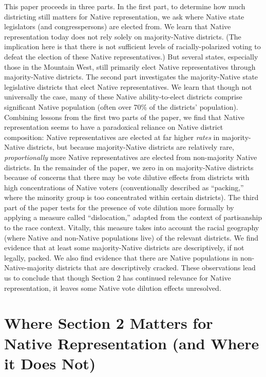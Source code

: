 \documentclass[12pt]{article}
\begin{document}
This paper proceeds in three parts. In the first part, to determine how much districting still matters for Native representation, we ask where Native state legislators (and congresspersons) are elected from. We learn that Native representation today does not rely solely on majority-Native districts. (The implication here is that there is not sufficient levels of racially-polarized voting to defeat the election of these Native representatives.) But several states, especially those in the Mountain West, still primarily elect Native representatives through majority-Native districts. The second part investigates the majority-Native state legislative districts that elect Native representatives. We learn that though not universally the case, many of these Native ability-to-elect districts comprise significant Native population (often over 70\% of the districts' population). Combining lessons from the first two parts of the paper, we find that Native representation seems to have a paradoxical reliance on Native district composition: Native representatives are elected at far higher \emph{rates} in majority-Native districts, but because majority-Native districts are relatively rare, \emph{proportionally} more Native representatives are elected from non-majority Native districts. In the remainder of the paper, we zero in on majority-Native districts because of concerns that there may be vote dilutive effects from districts with high concentrations of Native voters (conventionally described as ``packing,'' where the minority group is too concentrated within certain districts). The third part of the paper tests for the presence of vote dilution more formally by applying a measure called ``dislocation,'' adapted from the context of partisanship to the race context. Vitally, this measure takes into account the racial geography (where Native and non-Native populations live) of the relevant districts. We find evidence that at least some majority-Native districts are descriptively, if not legally, packed. We also find evidence that there are Native populations in non-Native-majority districts that are descriptively cracked. These observations lead us to conclude that though Section 2 has continued relevance for Native representation, it leaves some Native vote dilution effects unresolved.

\section{Where Section 2 Matters for Native Representation (and Where it Does Not)}
\end{document}
